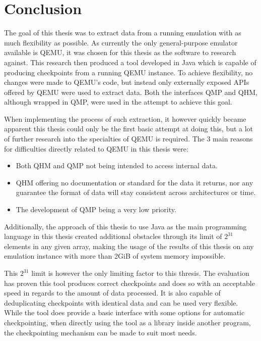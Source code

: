
\chapter{Conclusion}\label{chap:Conclusion}
The goal of this thesis was to extract data from a running emulation
with as much flexibility as possible.
As currently the only general-purpose emulator available is QEMU,
it was chosen for this thesis as the software to research against.
This research then produced a tool developed in Java
which is capable of producing checkpoints from a running QEMU instance.
To achieve flexibility, no changes were made to QEMU's code,
but instead only externally exposed APIs offered by QEMU were used to extract data.
Both the interfaces QMP and QHM, although wrapped in QMP,
were used in the attempt to achieve this goal.

When implementing the process of such extraction,
it however quickly became apparent this thesis could only be the first basic attempt at doing this,
but a lot of further research into the specialties of QEMU is required.
The 3 main reasons for difficulties directly related to QEMU in this thesis were:
\begin{itemize}
    \item Both QHM and QMP not being intended to access internal data.
    \item QHM offering no documentation or standard for the data it returns,
    nor any guarantee the format of data will stay consistent across architectures or time.
    \item The development of QMP being a very low priority.
\end{itemize}
Additionally, the approach of this thesis to use Java as the main programming language in this thesis created additional obstacles
through its limit of $2^{31}$ elements in any given array,
making the usage of the results of this thesis on any emulation instance with more than 2GiB of system memory impossible.

This $2^{31}$ limit is however the only limiting factor to this thresis.
The evaluation has proven this tool produces correct checkpoints and does so with an acceptable speed in regards to the amount of data processed.
It is also capable of deduplicating checkpoints with identical data and can be used very flexible.
While the tool does provide a basic interface with some options for automatic checkpointing,
when directly using the tool as a library inside another program,
the checkpointing mechanism can be made to suit most needs.

